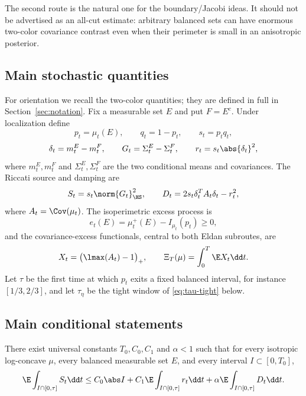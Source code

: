 \documentclass[../../main.tex]{subfiles}
\begin{document}
The second route is the natural one for the boundary/Jacobi ideas. It should not be advertised as
an all-cut estimate: arbitrary balanced sets can have enormous two-color covariance contrast even
when their perimeter is small in an anisotropic posterior.

\subsection{Main stochastic quantities}

For orientation we recall the two-color quantities; they are defined in full in
Section~\ref{sec:notation}. Fix a measurable set $E$ and put $F=E^c$. Under localization define
\[
  p_t=\mu_t(E),\qquad q_t=1-p_t,
  \qquad s_t=p_tq_t,
\]
\[
  \delta_t=m_t^E-m_t^F,
  \qquad G_t=\Sigma_t^E-\Sigma_t^F,
  \qquad r_t=s_t\abs{\delta_t}^2,
\]
where $m_t^E,m_t^F$ and $\Sigma_t^E,\Sigma_t^F$ are the two conditional means and covariances. The
Riccati source and damping are
\[
  S_t=s_t\norm{G_t}_{\HS}^2,
  \qquad
  D_t=2s_t\delta_t^TA_t\delta_t-r_t^2,
\]
where $A_t=\Cov(\mu_t)$. The isoperimetric excess process is
\[
  e_t(E)=\mu_t^+(E)-I_{\mu_t}(p_t)\ge0,
\]
and the covariance-excess functionals, central to both Eldan subroutes, are
\begin{equation}\label{eq:interface-def}
  X_t=\bigl(\lmax(A_t)-1\bigr)_+,
  \qquad
  \Xi_T(\mu)=\int_0^T\E X_t\dd t .
\end{equation}
Let $\tau$ be the first time at which $p_t$ exits a fixed balanced interval, for instance
$[1/3,2/3]$, and let $\tau_\eta$ be the tight window of \eqref{eq:tau-tight} below.

\subsection{Main conditional statements}

\begin{assumption}
\label{ass:all-cut-carleson}
There exist universal constants $T_0,C_0,C_1$ and $\alpha<1$ such that for every isotropic
log-concave $\mu$, every balanced measurable set $E$, and every interval $I\subset[0,T_0]$,
\begin{equation}\label{eq:all-cut-carleson}
  \E\int_{I\cap[0,\tau]} S_t\dd t
  \le
  C_0\abs I+C_1\E\int_{I\cap[0,\tau]}r_t\dd t
  +\alpha\E\int_{I\cap[0,\tau]}D_t\dd t .
\end{equation}
\end{assumption}
\end{document}
